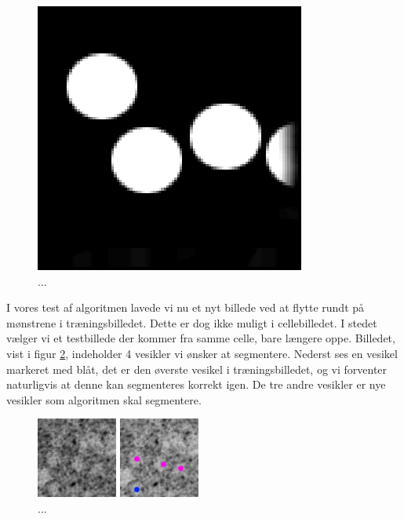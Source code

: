 \begin{figure}[H]
		\centering
		\includegraphics[scale=0.54]{files/postmethod/img/sld_preres2.png}
	\caption{...\label{fig:postmethod_sld_label2}}
\end{figure}

I vores test af algoritmen lavede vi nu et nyt billede ved at flytte rundt på mønstrene i træningsbilledet. Dette er dog ikke muligt i cellebilledet. I stedet vælger vi et testbillede der kommer fra samme celle, bare længere oppe. Billedet, vist i figur \ref{fig:postmethod_sld_res2}, indeholder 4 vesikler vi ønsker at segmentere. Nederst ses en vesikel markeret med blåt, det er den øverste vesikel i træningsbilledet, og vi forventer naturligvis at denne kan segmenteres korrekt igen. De tre andre vesikler er nye vesikler som algoritmen skal segmentere.

\begin{figure}[H]
	\begin{minipage}[b]{0.5\linewidth}
		\centering
		\includegraphics[scale=3]{files/postmethod/img/imTest2.png}
	\end{minipage}
	\hspace{0.8cm}
	\begin{minipage}[b]{0.5\linewidth}
		\centering
		\includegraphics[scale=3]{files/postmethod/img/sld_gt3.png}
	\end{minipage}
	\caption{...\label{fig:postmethod_sld_res2}}
\end{figure}

